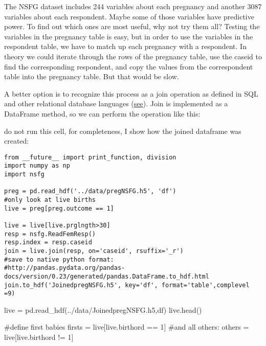 \documentclass[
  letterpaper,
  DIV=11,
  numbers=noendperiod]{scrreprt}
\newenvironment{Shaded}{\begin{snugshade}}{\end{snugshade}}
\newcommand{\CommentTok}[1]{\textcolor[rgb]{0.37,0.37,0.37}{#1}}
\newcommand{\DecValTok}[1]{\textcolor[rgb]{0.68,0.00,0.00}{#1}}
\newcommand{\NormalTok}[1]{\textcolor[rgb]{0.00,0.23,0.31}{#1}}
\newcommand{\OperatorTok}[1]{\textcolor[rgb]{0.37,0.37,0.37}{#1}}
\newcommand{\StringTok}[1]{\textcolor[rgb]{0.13,0.47,0.30}{#1}}
\begin{document}
The NSFG dataset includes 244 variables about each pregnancy and another
3087 variables about each respondent. Maybe some of those variables have
predictive power. To find out which ones are most useful, why not try
them all? Testing the variables in the pregnancy table is easy, but in
order to use the variables in the respondent table, we have to match up
each pregnancy with a respondent. In theory we could iterate through the
rows of the pregnancy table, use the caseid to find the corresponding
respondent, and copy the values from the correspondent table into the
pregnancy table. But that would be slow.

A better option is to recognize this process as a join operation as
defined in SQL and other relational database languages
(\href{https://en.wikipedia.org/wiki/Join_(SQL)}{see}). Join is
implemented as a DataFrame method, so we can perform the operation like
this:

do not run this cell, for completeness, I show how the joined dataframe
was created:

\begin{verbatim}
from __future__ import print_function, division
import numpy as np
import nsfg

preg = pd.read_hdf('../data/pregNSFG.h5', 'df')
#only look at live births
live = preg[preg.outcome == 1]

live = live[live.prglngth>30]
resp = nsfg.ReadFemResp()
resp.index = resp.caseid
join = live.join(resp, on='caseid', rsuffix='_r')
#save to native python format:
#http://pandas.pydata.org/pandas-docs/version/0.23/generated/pandas.DataFrame.to_hdf.html
join.to_hdf('JoinedpregNSFG.h5', key='df', format='table',complevel =9)
\end{verbatim}

\begin{Shaded}
\begin{Highlighting}[]
\NormalTok{live }\OperatorTok{=}\NormalTok{ pd.read\_hdf(}\StringTok{\textquotesingle{}../data/JoinedpregNSFG.h5\textquotesingle{}}\NormalTok{,}\StringTok{\textquotesingle{}df\textquotesingle{}}\NormalTok{)}
\NormalTok{live.head()}
\end{Highlighting}
\end{Shaded}

\begin{Shaded}
\begin{Highlighting}[]
\CommentTok{\#define first babies}
\NormalTok{firsts }\OperatorTok{=}\NormalTok{ live[live.birthord }\OperatorTok{==} \DecValTok{1}\NormalTok{]}
\CommentTok{\#and all others:}
\NormalTok{others }\OperatorTok{=}\NormalTok{ live[live.birthord }\OperatorTok{!=} \DecValTok{1}\NormalTok{]}
\end{Highlighting}
\end{Shaded}
\end{document}
